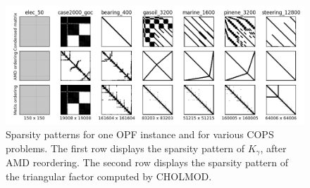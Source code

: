 \begin{figure}[!ht]
  \centering
  \includegraphics[width=.9\textwidth]{../figures/sparsity_pattern.png}
  \caption{Sparsity patterns for one OPF instance and for various
    COPS problems. The first row displays the sparsity pattern
    of $K_\gamma$, after AMD reordering. The second row displays
    the sparsity pattern of the triangular factor computed by CHOLMOD.
    \label{fig:cops:nnz}
  }
\end{figure}


